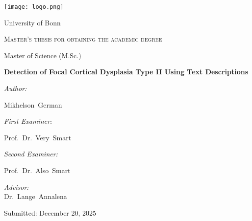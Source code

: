 \begin{titlepage}
	\centering
     
    \texttt{[image: logo.png]}\par
    \vspace{0.7cm}
	{\textsc\LARGE University of Bonn}\par
	\vspace{1.2cm}
	{\scshape Master's thesis for obtaining the academic degree \par\glqq Master of Science (M.Sc.)\grqq  \par}
	\vspace{2cm}
	
	{\Large\bfseries Detection of Focal Cortical Dysplasia Type II Using Text Descriptions }\par
	\vspace{1.4cm}
	
	\noindent
    \begin{minipage}[t]{0.4\textwidth}
        \begin{flushleft} \large
            \emph{Author:}\par
            Mikhelson~German
        \end{flushleft}        
    \end{minipage}    
    \begin{minipage}[t]{0.5\textwidth}
        \begin{flushright} \large
            \emph{First Examiner:}\par
            Prof.~Dr.~Very~Smart\par\vspace{0.5cm}
            
            \emph{Second Examiner:}\par
            Prof.~Dr.~Also~Smart\par\vspace{0.5cm}

            \emph{Advisor:} \\
            Dr.~Lange~Annalena\par\vspace{0.5cm}
        \end{flushright}
    \end{minipage}

    \vfill
	
    {\large Submitted:\hspace{1cm} December 20, 2025}
\end{titlepage}
